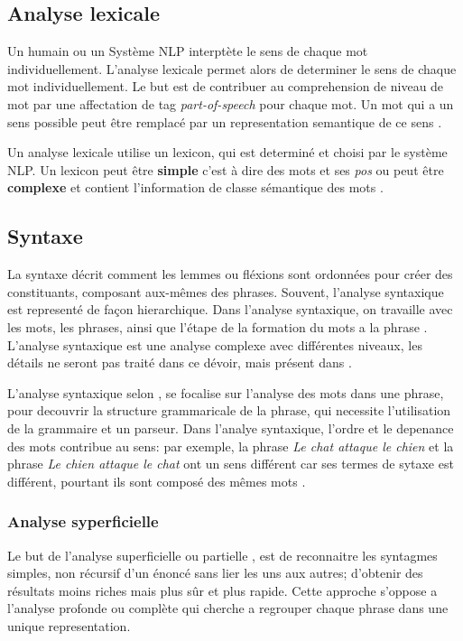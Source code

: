 \subsection{Analyse lexicale}
Un humain ou un Système NLP interptète le sens de chaque mot individuellement. L'analyse lexicale permet alors de determiner le sens de chaque mot individuellement. Le but est de contribuer au comprehension de niveau de mot par une affectation de tag \textit{part-of-speech} pour chaque mot. Un mot qui a un sens possible peut être remplacé par un representation semantique de ce sens \citep{natural-language-processing}.

Un analyse lexicale utilise un lexicon, qui est determiné et choisi par le système NLP. Un lexicon peut être \textbf{simple} c'est à dire des mots et ses \textit{pos} ou peut être \textbf{complexe} et contient l'information de classe sémantique des mots \citep{natural-language-processing}.

\subsection{Syntaxe}
La syntaxe décrit comment les lemmes ou fléxions sont ordonnées pour créer des constituants, composant aux-mêmes des phrases. Souvent, l'analyse syntaxique est representé de façon hierarchique. Dans l'analyse syntaxique, on travaille avec les mots, les phrases, ainsi que l'étape de la formation du mots a la phrase \citep{automatic-nlp}. L'analyse syntaxique est une analyse complexe avec différentes niveaux, les détails ne seront pas traité dans ce dévoir, mais présent dans  \citep{automatic-nlp}.

L'analyse syntaxique selon \citeauthor{natural-language-processing}, se focalise sur l'analyse des mots dans une phrase, pour decouvrir la structure grammaricale de la phrase, qui necessite l'utilisation de la grammaire et un parseur. Dans l'analye syntaxique, l'ordre et le depenance des mots contribue au sens: par exemple, la phrase \textit{\og Le chat attaque le chien \fg{}} et la phrase \textit{\og Le chien attaque le chat \fg{}} ont un sens différent car ses termes de sytaxe est différent, pourtant ils sont composé des mêmes mots \citep{natural-language-processing}.

\subsubsection{Analyse syperficielle}
Le but de l'analyse superficielle ou partielle \citep{automatic-nlp}, est de reconnaitre les syntagmes simples, non récursif d'un énoncé sans lier les uns aux autres; d'obtenir des résultats moins riches mais plus sûr et plus rapide. Cette approche s'oppose a l'analyse profonde ou complète qui cherche a regrouper chaque phrase dans une unique representation.

